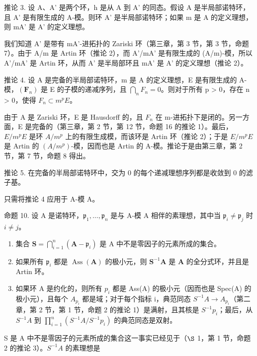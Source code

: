 推论 3. 设 A、A' 是两个环，h 是从 A 到 A' 的同态。假设 A 是半局部诺特环，且 A' 是有限生成的 A-模。则环 A' 是半局部诺特环；如果 m 是 A 的定义理想，则 mA' 是 A' 的定义理想。

我们知道 A' 是带有 mA'-进拓扑的 Zariski 环（第三章，第 3 节，第 3 节，命题 7）。由于 A/m 是 Artin 环（推论 2），而 A'/mA' 是有限生成的 (A/m)-模，所以 A'/mA' 是 Artin 环，从而 A' 是半局部环且 mA' 是 A' 的定义理想（推论 2）。

推论 4. 设 A 是完备的半局部诺特环，m 是 A 的定义理想，E 是有限生成的 A-模，\((\mathbf{F}_{n})\) 是 E 的子模的递减序列，且 \(\bigcap_{n} F_{n} = 0\)。则对于所有 p \textgreater{} 0，存在 n \textgreater{} 0，使得 \(F_{n} \subset m^{p}E\)。

由于 A 是 Zariski 环，E 是 Hausdorff 的，且 \(F_{n}\) 在 m-进拓扑下是闭的。另一方面，E 是完备的（第三章，第 2 节，第 12 节，命题 16 的推论 1）。最后，\(E/m^{p}E\) 是环 \(A/m^{p}\) 上的有限生成模，而该环是 Artin 环（推论 2）；于是 \(E/m^{p}E\) 是 Artin 的 \((A/m^{p})\)-模，因而也是 Artin 的 A-模。推论于是由第三章，第 2 节，第 7 节，命题 8 得出。

推论 5. 在完备的半局部诺特环中，交为 0 的每个递减理想序列都是收敛到 0 的滤子基。

只需将推论 4 应用于 A-模 A。

命题 10. 设 A 是诺特环，\(\mathfrak{p}_1, \ldots, \mathfrak{p}_n\) 是与 A-模 A 相伴的素理想，其中当 \(\mathfrak{p}_i \neq \mathfrak{p}_j\) 时 \(i \neq j\)。

\begin{enumerate}
\def\labelenumi{(\roman{enumi})}
\item
  集合 \(\mathbf{S} = \bigcap_{i=1}^{n} (\mathbf{A} - \mathfrak{p}_i)\) 是 A 中不是零因子的元素所成的集合。\\
\item
  如果所有 \(\mathfrak{p}_i\) 都是 \(\operatorname{Ass}(\mathbf{A})\) 的极小元，则 \(\mathbf{S}^{-1}\mathbf{A}\) 是 \(\mathbf{A}\) 的全分式环，并且是 Artin 环。
\item
  如果环 A 是约化的，则所有 \(p_{i}\) 都是 Ass(A) 的极小元（因而也是 Spec(A) 的极小元），且每个 \(A_{p_{i}}\) 都是域；对于每个指标 i，典范同态 \(S^{-1}A \to A_{p_{i}}\)（第二章，第 2 节，第 1 节，命题 2 的推论 1）是满射，且其核是 \(S^{-1}p_{i}\)；最后，从 \(S^{-1}A\) 到 \(\prod_{i=1}^{n} (S^{-1}A/S^{-1}p_{i})\) 的典范同态是双射。
\end{enumerate}

S 是 A 中不是零因子的元素所成的集合这一事实已经见于（\(\S\) 1，第 1 节，命题 2 的推论 3）。\(S^{-1}A\) 的素理想是

